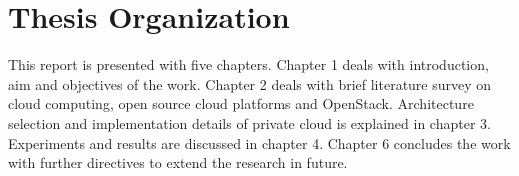 \section{Thesis Organization}
This report is presented with five chapters. Chapter 1 deals with introduction, aim and objectives of the work. Chapter 2 deals with brief literature survey on cloud computing, open source cloud platforms and OpenStack. Architecture selection and implementation details of private cloud is explained in chapter 3. Experiments and results are discussed in chapter 4. Chapter 6 concludes the work with further directives to extend the research in future.

\makeatother